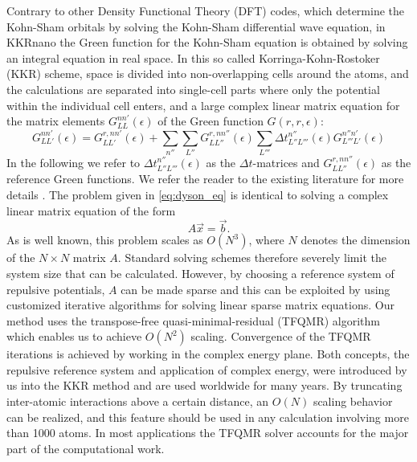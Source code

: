 \documentclass[graybox]{svmult}
\newcommand{\matr}[1]{\bm{\mathit{#1}}}
\begin{document}
Contrary to other Density Functional Theory (DFT) codes, which determine the Kohn-Sham orbitals by solving
the Kohn-Sham differential wave equation, in KKRnano the Green function for the Kohn-Sham
equation is obtained by solving an integral equation in real space. In this so called Korringa-Kohn-Rostoker
(KKR) scheme, space is divided
into non-overlapping cells around the atoms, and the calculations are separated into single-cell parts
where only the potential within the individual cell enters, and a large complex linear matrix equation for 
the matrix elements $G_{LL}^{nn'} (\epsilon)$ of the Green function $G(r, r , \epsilon)$:
\begin{equation}
	G_{LL'}^{nn'} (\epsilon) = G_{LL'}^{r,nn'} (\epsilon) + \sum_{n''} \sum_{L''}
	G_{LL''}^{r,nn''} (\epsilon) \sum_{L'''} \Delta t_{L'' L'''}^{n''} (\epsilon)
	G_{L'''L'}^{n''n'} (\epsilon)
	\label{eq:dyson_eq}
\end{equation}
In the following we refer to $\Delta t_{L'' L'''}^{n''} (\epsilon)$ as the $\Delta t$-matrices and
$G_{LL''}^{r,nn''} (\epsilon)$ as the reference Green functions. We refer the reader to the existing
literature for more details \cite{zeller_towards_2008}.
The problem given in \cref{eq:dyson_eq} is identical to solving a complex linear matrix equation of the form
\begin{equation}
	\label{eq:axb}
	\matr{A} \vec{x} = \vec{b}.
\end{equation}
As is well known, this problem scales as $O(N^3)$, where $N$ denotes the dimension of the $N \times N$
matrix $\matr{A}$. Standard solving schemes therefore severely limit the system size that can
be calculated.
However, by choosing a reference system of repulsive potentials,
$\matr{A}$ can be made sparse and this can be exploited
by using customized iterative algorithms for solving linear sparse matrix equations.
Our method uses the transpose-free quasi-minimal-residual (TFQMR) algorithm \cite{freund_qmr:_1991}
which enables us to achieve $O(N^2)$ scaling. 
Convergence of the TFQMR iterations is achieved by working in the complex energy plane. Both concepts,
the repulsive reference system and application of complex energy, were
introduced by us into the KKR method \cite{zeller_application_1982,zeller_theory_1995}
and are used worldwide for many years. 
By truncating inter-atomic interactions above a certain distance, an $O(N)$ scaling 
behavior can be realized, and this feature should be used in any calculation involving more than 1000 atoms.
In most applications the TFQMR solver accounts for the major part of the computational work.
\end{document}
